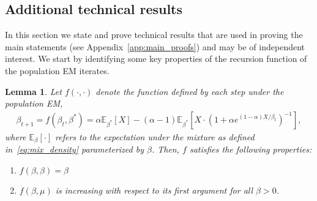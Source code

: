 \documentclass[runningheads]{llncs}
\newtheorem{lem}[theorem]{Lemma}
\begin{document}
\begin{subappendices}
\section{Additional technical results}
\label{app:technical}
In this section we state and prove technical results that are used in
proving the main statements (see Appendix~\ref{app:main_proofs}) and may be of independent interest.
We start by identifying some key properties of the recursion function of the population EM iterates.
\begin{lem} \label{lem:f_properties}
Let $f(\cdot, \cdot)$ denote the function defined by each step under the
population EM,
\begin{align}
  \label{eq:f}
\beta_{t+1}
  = f(\beta_t, \beta^*)
  = \alpha \mathbb{E}_{\beta^*}[X]
  - (\alpha - 1)\mathbb{E}_{\beta^*}[X \cdot (1+\alpha e^{(1-\alpha)X / \beta_t})^{-1}],
\end{align}
where $\mathbb{E}_{\beta}[\cdot]$ refers to the expectation under the mixture as
defined in~\eqref{eq:mix_density} parameterized by $\beta$.
Then, $f$ satisfies the following properties:
\begin{enumerate}
    \item $f(\beta,\beta) = \beta$
    \item $f(\beta, \mu)$ is increasing with respect to its first argument for
      all $\beta>0$.
\end{enumerate}
\end{lem}


\end{subappendices}
\end{document}
